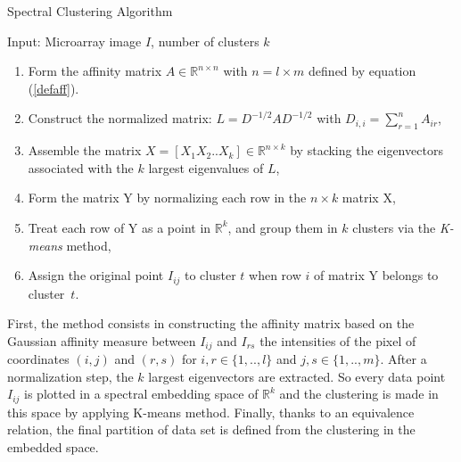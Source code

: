\documentclass[]{svmult}
\begin{document}
\vspace{-0.2cm}
\begin{algorithm}
\caption{Spectral Clustering Algorithm}
Input: Microarray image $I$, number of clusters $k$
\begin{enumerate}
\item Form the affinity matrix $A\in\mathbb{R}^{n\times n}$  with $n=l\times m$ defined by equation (\ref{defaff}).
\item Construct the normalized matrix: $L=D^{-1/2}AD^{-1/2}$ with $D_{i,i}=\sum_{r=1}^{n} A_{ir} $,
\item Assemble the matrix $X=[X_1X_2..X_k]\in \mathbb{R}^{n\times k}$ by stacking the eigenvectors associated with the {$k$} largest eigenvalues of $L$,
\item Form the matrix Y by normalizing each row in the $n \times k$ matrix X,
\item Treat each row of Y as a point in $\mathbb{R}^{k}$, and group them in $k$ clusters via the {\it K-means} method,
\item Assign the original point $I_{ij}$ to cluster $t$ when row $i$ of matrix Y belongs to cluster~$t$. 
\end{enumerate}
\label{algo}
\end{algorithm}
\vspace{-0.3cm}
First, the method  consists in constructing the affinity matrix based on the
Gaussian affinity measure between $I_{ij}$ and $I_{rs}$ the intensities of the
pixel of coordinates $(i,j)$ and $(r,s)$ for $i,r\in \{1,..,l\}$ and $j,s\in
\{1,..,m\}$. After a normalization step, the $k$ largest eigenvectors are
extracted. So every data point $I_{ij}$ is plotted in a spectral embedding
space of $\mathbb{R}^k$ and the clustering is made in this space by applying
K-means method. Finally, thanks to an equivalence relation, the final
partition of  data set is defined from the clustering in the embedded space.
\end{document}
